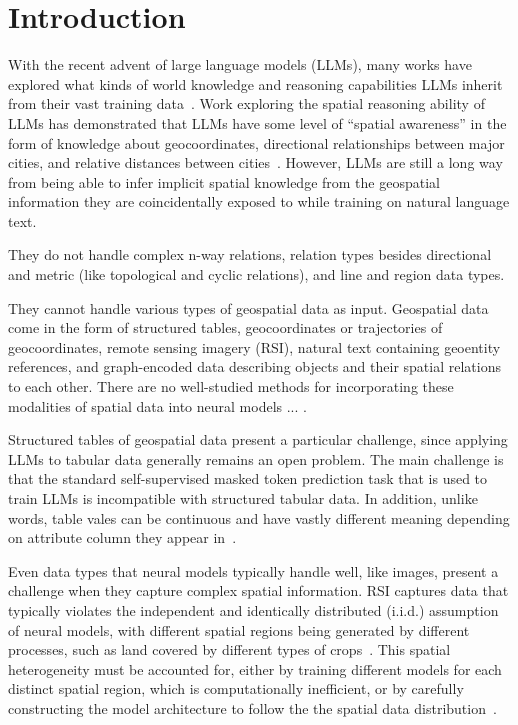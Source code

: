 \section{Introduction}

\label{section:introduction}

With the recent advent of large language models (LLMs), many works have explored what kinds of world knowledge and reasoning capabilities LLMs inherit from their vast training data~\cite{Mai2023, Bhandari2023, Qi2023}.
Work exploring the spatial reasoning ability of LLMs has demonstrated that LLMs have some level of ``spatial awareness'' in the form of knowledge about geocoordinates, directional relationships between major cities, and relative distances between cities~\cite{Bhandari2023, Qi2023}.
However, LLMs are still a long way from being able to infer implicit spatial knowledge from the geospatial information they are coincidentally exposed to while training on natural language text.


They do not handle complex n-way relations, relation types besides directional and metric (like topological and cyclic relations), and line and region data types.


They cannot handle various types of geospatial data as input.
Geospatial data come in the form of structured tables, geocoordinates or trajectories of geocoordinates, remote sensing imagery (RSI), natural text containing geoentity references, and graph-encoded data describing objects and their spatial relations to each other.
%
There are no well-studied methods for incorporating these modalities of spatial data into neural models ...  \cite{Trappolini2023}.


Structured tables of geospatial data present a particular challenge, since applying LLMs to tabular data generally remains an open problem. 
The main challenge is that the standard self-supervised masked token prediction task that is used to train LLMs is incompatible with structured tabular data. \cite{Tan2023, Qi2023}
In addition, unlike words, table vales can be continuous and have vastly different meaning depending on attribute column they appear in~\cite{Qi2023}.


Even data types that neural models typically handle well, like images, present a challenge when they capture complex spatial information.
%
RSI captures data that typically violates the independent and identically distributed (i.i.d.) assumption of neural models, with different spatial regions being generated by different processes, such as land covered by different types of crops~\cite{Xie2021}. 
This spatial heterogeneity must be accounted for, either by training different models for each distinct spatial region, which is computationally inefficient, or by carefully constructing the model architecture to follow the the spatial data distribution~\cite{Gupta2021}.


